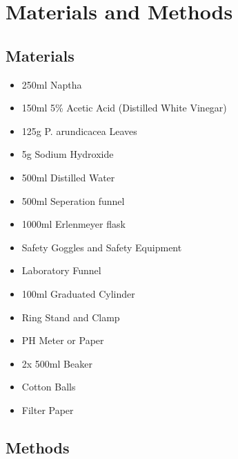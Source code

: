 \documentclass[12pt, a4paper]{article}
\begin{document}
\section{Materials and Methods}

\subsection{Materials}
\begin{itemize}
    \item 250ml Naptha
    \item 150ml 5\% Acetic Acid (Distilled White Vinegar)
    \item 125g P. arundicacea Leaves
    \item 5g Sodium Hydroxide
    \item 500ml Distilled Water
    \item 500ml Seperation funnel
    \item 1000ml Erlenmeyer flask
    \item Safety Goggles and Safety Equipment
    \item Laboratory Funnel
    \item 100ml Graduated Cylinder
    \item Ring Stand and Clamp
    \item PH Meter or Paper
    \item 2x 500ml Beaker
    \item Cotton Balls 
    \item Filter Paper
\end{itemize}

\subsection{Methods}
\end{document}
